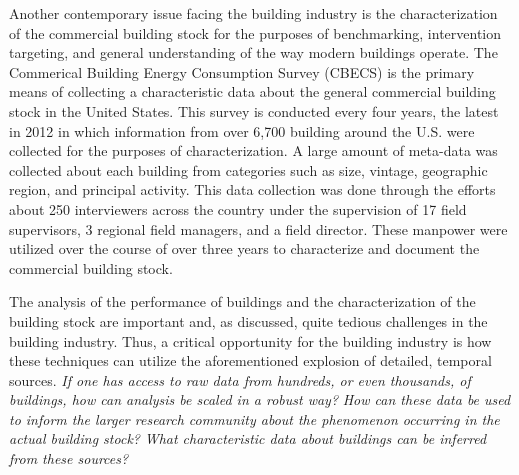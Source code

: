Another contemporary issue facing the building industry is the characterization of the commercial building stock for the purposes of benchmarking, intervention targeting, and general understanding of the way modern buildings operate. The Commerical Building Energy Consumption Survey (CBECS) is the primary means of collecting a characteristic data about the general commercial building stock in the United States. This survey is conducted every four years, the latest in 2012 in which information from over 6,700 building around the U.S. were collected for the purposes of characterization. A large amount of meta-data was collected about each building from categories such as size, vintage, geographic region, and principal activity. This data collection was done through the efforts about 250 interviewers across the country under the supervision of 17 field supervisors, 3 regional field managers, and a field director. These manpower were utilized over the course of over three years to characterize and document the commercial building stock. 

The analysis of the performance of buildings and the characterization of the building stock are important and, as discussed, quite tedious challenges in the building industry. Thus, a critical opportunity for the building industry is how these techniques can utilize the aforementioned explosion of detailed, temporal sources. \emph{If one has access to raw data from hundreds, or even thousands, of buildings, how can analysis be scaled in a robust way?} \emph{How can these data be used to inform the larger research community about the phenomenon occurring in the actual building stock?} \emph{What characteristic data about buildings can be inferred from these sources?}

